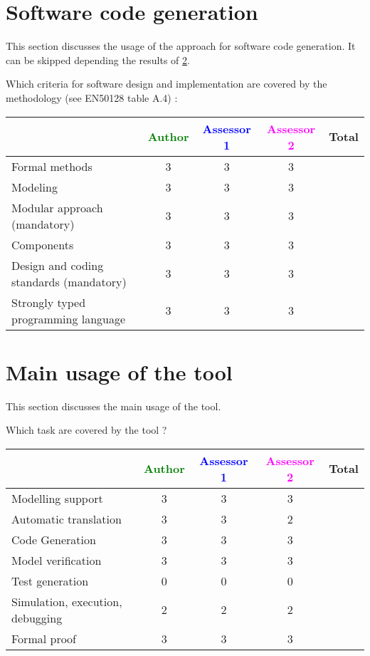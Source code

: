 \section{Software code generation}
This section discusses the usage of the approach for software code generation.
It can be skipped depending the results of \ref{main_usage}.

Which criteria for software design and implementation are covered by the methodology
(see EN50128 table A.4) :

\begin{tabular}{|l | c | c | c | c|}
\hline
& \textcolor{green}{Author} & \textcolor{blue}{Assessor 1} & \textcolor{magenta}{Assessor 2} & Total \\
\hline
Formal methods  & 3 & 3 & 3 &  \\
\hline 
Modeling  & 3 & 3 & 3 &  \\
\hline
Modular approach (mandatory) & 3 & 3 & 3 &  \\
\hline
Components & 3 & 3 & 3 &  \\
\hline
Design and coding standards (mandatory) & 3 & 3 & 3 &  \\
\hline
Strongly typed programming language & 3 & 3 & 3 &  \\
\hline

\end{tabular}



\section{Main usage of the tool}
\label{main_usage}

This section discusses the main usage of the tool.

Which task are covered by the tool ?


\begin{tabular}{|l | c | c | c | c|}
\hline
& \textcolor{green}{Author} & \textcolor{blue}{Assessor 1} & \textcolor{magenta}{Assessor 2} & Total \\
\hline 
Modelling support & 3 & 3 & 3 &  \\
\hline
Automatic translation  & 3 & 3 & 2 & \\
\hline
Code Generation  & 3 & 3 & 3 & \\
\hline
Model verification & 3 & 3 & 3  & \\
\hline
Test generation & 0 & 0 & 0& \\
\hline
Simulation, execution, debugging & 2  & 2 & 2 & \\
\hline
Formal proof & 3 & 3 & 3 & \\
\hline
\end{tabular}

